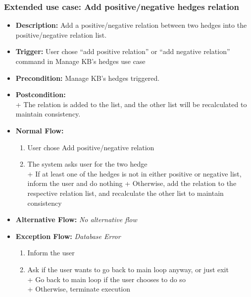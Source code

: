 \documentclass[../gr-final.tex]{subfiles}
\begin{document}
\subsubsection{Extended use case: Add positive/negative hedges relation}
\begin{itemize}
  \item {\bfseries Description:} Add a positive/negative relation
    between two hedges into the
    positive/negative relation list. 
  \item {\bfseries Trigger:} User chose ``add positive relation'' or
    ``add negative relation'' command in
    Manage KB's hedges use case
  \item {\bfseries Precondition:} Manage KB's hedges triggered.
  \item {\bfseries Postcondition:}\\
    \indent + The relation is added to the list, and the other
    list will be recalculated to maintain consistency.    
  \item {\bfseries Normal Flow:}
    \begin{enumerate}
      \item User chose Add positive/negative relation 
      \item The system asks user for the two hedge\\
        \indent + If at least one of the hedges is not in either
        positive or negative list, inform the
        user and do nothing
        \indent + Otherwise, add the relation to the respective
        relation list, and recalculate the other list to maintain
        consistency
    \end{enumerate}
  \item {\bfseries Alternative Flow:} {\em No alternative flow}
  \item {\bfseries Exception Flow:}
    {\em Database Error}
    \begin{enumerate}
      \item Inform the user
      \item Ask if the user wants to go back to main loop anyway,
        or just exit\\
        \indent + Go back to main loop if the user chooses to do
        so\\
        \indent + Otherwise, terminate execution
    \end{enumerate}
\end{itemize}
\end{document}

